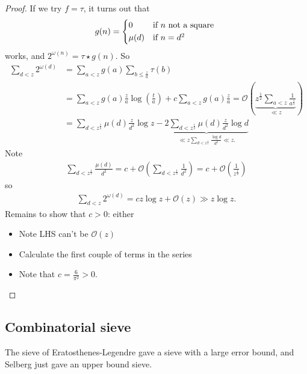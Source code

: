 \documentclass{article}
\newcommand{\1}{\mathbbm{1}}
\newcommand{\bigO}{\mathcal{O}}
\begin{document}
\begin{proof}
  If we try $f = \tau$, it turns out that
  \begin{equation*}
    g(n)=
    \begin{cases*}
      0 & if $n$ not a square \\
      \mu(d) & if $n=d^2$
    \end{cases*}
  \end{equation*}
  works, and $2^{\omega(n)} = \tau \star g(n)$.
  So
  \begin{align*}
    \sum_{d < z} 2^{\omega(d)} &= \sum_{a < z} g(a) \sum_{b \leq \frac za} \tau(b) \\
                               &= \sum_{a < z} g(a) \frac{z}{a} \log(\frac{t}{a}) + c \sum_{a < z} g(a) \frac{z}{a} = \bigO\left(\underbrace{z^{\frac{1}{2}} \sum_{a < z} \frac{1}{a^{\frac{1}{2}}}}_{\ll z}\right) \\
                               &= \sum_{d < z^{\frac{1}{2}}} \mu(d) \frac{z}{d^2} \log z - \underbrace{2 \sum_{d < z^{\frac{1}{2}}} \mu(d) \frac{z}{d^2} \log d}_{\ll z \sum_{d < z^{\frac 12}} \frac{\log d}{d^2} \ll z.}
  \end{align*}
  Note
  \begin{align*}
    \sum_{d < z^{\frac 12}} \frac{\mu(d)}{d^2} = c + \bigO\left(\sum_{d < z^{\frac 12}} \frac{1}{d^2}\right) = c + \bigO\left(\frac{1}{z^{\frac12}}\right)
  \end{align*}
  so
  \begin{align*}
    \sum_{d < z} 2^{\omega(d)} = c z \log z + \bigO(z) \gg z \log z.
  \end{align*}
  Remains to show that $c > 0$: either
  \begin{itemize}
    \item Note LHS can't be $\bigO(z)$
    \item Calculate the first couple of terms in the series
    \item Note that $c = \frac{6}{\pi^2} > 0$. \qedhere
  \end{itemize}
\end{proof}

\subsection{Combinatorial sieve}
The sieve of Eratosthenes-Legendre gave a sieve with a large error bound, and Selberg just gave an upper bound sieve.
\end{document}
